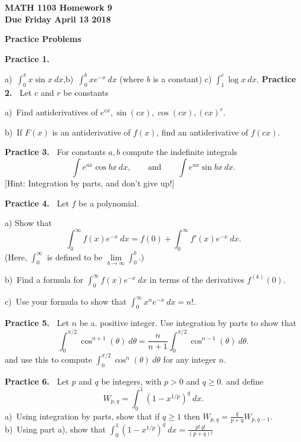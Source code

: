 \documentclass[12pt]{article}
\theoremstyle{definition}
\theoremstyle{remark}
\theoremstyle{definition}
\newenvironment{Solution}{\noindent\textbf{Solution.}}{}
\begin{document}
  

{\bf MATH 1103 Homework 9 }\\
{\bf Due Friday April 13  2018}

{\bf Practice Problems}

{\bf Practice 1.\ } 

a)\ $\int_0^\pi x\sin x\ dx$,\qquad b)\ $\int_0^b xe^{-x}\ dx$ (where $b$ is a constant)
\qquad c) $\int_1^e \log x\ dx$.
{\bf Practice 2.\ } Let $c$ and $r$ be constants

a)\ Find antiderivatives of 
$e^{cx}, \sin(cx), \cos( cx), (cx)^{r}$. 

b)\ If $F(x)$ is an antiderivative of $f(x)$, find an antiderivative of $f(cx)$. 

{\bf Practice 3.\ } For constants $a,b$ compute the indefinite integrals
\[\int e^{ax}\cos bx\ dx, \qquad \text{and}\qquad \int e^{ax}\sin bx\ dx.\]
[Hint: Integration by parts, and don't give up!]

{\bf Practice 4.\ } Let $f$ be a polynomial.

a) Show that 
\[\int_0^\infty f(x) e^{-x}\ dx=f(0)+\int_0^\infty f'(x) e^{-x}\ dx.\]
(Here, $\int_0^\infty$ is defined to be $\lim\limits_{b\to\infty}\int_0^b$.)

b)\ Find a formula for $\int_0^\infty f(x) e^{-x}\ dx$ in terms of the derivatives $f^{(k)}(0)$. 

c)\ Use your formula to show that $\int_0^\infty x^n e^{-x}\ dx=n!$.



{\bf Practice 5.\ } Let $n$ be a. positive integer. Use integration by parts to show that  
\[\int_0^{\pi/2}\cos^{n+1}(\theta)\ d\theta=\frac{n}{n+1}\int_0^{\pi/2}\cos^{n-1}(\theta)\ d\theta.
\]
and use this to compute $\int_0^{\pi/2}\cos^{n}(\theta)\ d\theta$ for any integer $n$. 

{\bf Practice 6.\ } Let $p$ and $q$ be integers, with $p>0$ and $q\geq 0$. 
and define 
\[W_{p,q}=\displaystyle{\int_0^1(1-x^{1/p})^q\ dx.}\]
a)\ Using integration by parts, show that if $q\geq 1$ then 
$\displaystyle{W_{p,q}=\frac{q}{p+q} W_{p,q-1}.}$
\newline
b)\ Using part a), show that 
$\displaystyle{\int_0^1(1-x^{1/p})^q\ dx=\frac{p!\ q!}{(p+q)!}}$
\end{document}
